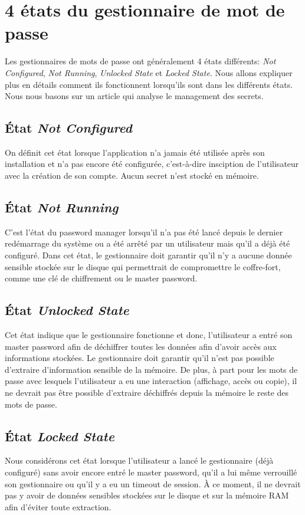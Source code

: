 \section{4 états du gestionnaire de mot de passe \label{etats}}
Les gestionnaires de mots de passe ont généralement 4 états différents: \textit{Not Configured}, \textit{Not Running}, \textit{Unlocked State} et \textit{Locked State}. Nous allons expliquer plus en détails comment ils fonctionnent lorsqu'ils sont dans les différents états. Nous nous basons sur un article qui analyse le management des secrets\cite{iseexploit}.

\subsection{État \textit{Not Configured}}
On définit cet état lorsque l'application n'a jamais été utilisée après son installation et n'a pas encore été configurée, c'est-à-dire insciption de l'utilisateur avec la création de son compte. Aucun secret n'est stocké en mémoire.
\subsection{État \textit{Not Running}}
C'est l'état du password manager lorsqu'il n'a pas été lancé depuis le dernier redémarrage du système ou a été arrêté par un utilisateur mais qu'il a déjà été configuré. Dans cet état, le gestionnaire doit garantir qu'il n'y a aucune donnée sensible stockée sur le disque qui permettrait de compromettre le coffre-fort, comme une clé de chiffrement ou le master password.
\subsection{État \textit{Unlocked State}}
Cet état indique que le gestionnaire fonctionne et donc, l'utilisateur a entré son master password afin de déchiffrer toutes les données afin d'avoir accès aux informations stockées. Le gestionnaire doit garantir qu'il n'est pas possible d'extraire d'information sensible de la mémoire. De plus, à part pour les mots de passe avec lesquels l'utilisateur a eu une interaction (affichage, accès ou copie), il ne devrait pas être possible d'extraire déchiffrés depuis la mémoire le reste des mots de passe.
\subsection{État \textit{Locked State}}
Nous considérons cet état lorsque l'utilisateur a lancé le gestionnaire (déjà configuré) sans avoir encore entré le master password, qu'il a lui même verrouillé son gestionnaire ou qu'il y a eu un timeout de session. À ce moment, il ne devrait pas y avoir de données sensibles stockées sur le disque et sur la mémoire RAM afin d'éviter toute extraction. 

